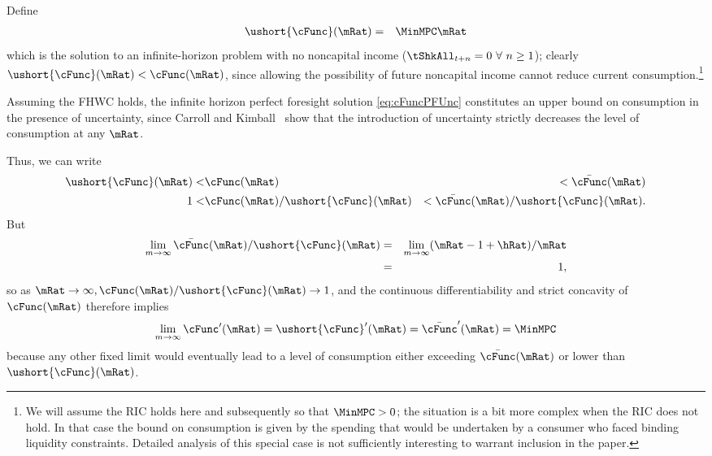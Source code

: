 \documentclass[titlepage]{\econtex}\providecommand{\texname}{BufferStockTheory}%
\begin{document}
{\label{subsec:LimitsAsmtToInfty}

Define
\begin{eqnarray}
   \ushort{\cFunc}(\mRat) & = & \MinMPC \mRat \nonumber
\end{eqnarray}
which is the solution to an infinite-horizon problem with no noncapital
income
($\tShkAll_{t+n} = 0~\forall~n\geq1$); 
  clearly $\ushort{\cFunc}(\mRat)
< \cFunc(\mRat)$, since allowing the possibility of future noncapital
income cannot reduce current consumption.\footnote{We will assume the
  RIC holds here and subsequently so that $\MinMPC > 0$; the situation
  is a bit more complex when the RIC does not hold.   In that case the bound on consumption is given by the spending
  that would be undertaken by a consumer who faced binding liquidity
  constraints.  Detailed analysis of this special case is not
  sufficiently interesting to warrant inclusion in the paper.}

Assuming the FHWC holds, the infinite horizon perfect
foresight solution \eqref{eq:cFuncPFUnc} constitutes an upper
bound on consumption in the presence of uncertainty, since Carroll and
Kimball~\citeyearpar{carroll&kimball:concavity} show that the introduction of
uncertainty strictly decreases the level of consumption at any $\mRat$.

Thus, we can write
\begin{eqnarray}  \label{eq:lowerltupper}
\ushort{\cFunc}(\mRat) < & \cFunc(\mRat) & < \bar{\cFunc}(\mRat) \nonumber \\
1 < & \cFunc(\mRat)/\ushort{\cFunc}(\mRat) & < \bar{\cFunc}(\mRat)/\ushort{\cFunc}(\mRat). \nonumber
\end{eqnarray}
But
\begin{eqnarray}  \label{eq:limitlowerupper}
\lim_{m \rightarrow \infty} \bar{\cFunc}(\mRat)/\ushort{\cFunc}(\mRat) & = &
\lim_{m \rightarrow \infty} (\mRat -1+ \hRat)/\mRat \nonumber \\
& = & 1, \nonumber
\end{eqnarray}
so as $\mRat \rightarrow \infty, \cFunc(\mRat)/\ushort{\cFunc}(\mRat)
\rightarrow 1$, and the continuous differentiability and strict
concavity of $\cFunc(\mRat)$ therefore implies
\begin{equation}  \label{eq:limxtoinftycp}
\lim_{m \rightarrow \infty} \cFunc^{\prime}(\mRat) =
\ushort{\cFunc}^{\prime}(\mRat) = \bar{\cFunc}^{\prime}(\mRat) = \MinMPC \notag
\end{equation}
because any other fixed limit would eventually lead to a level of
consumption either exceeding $\bar{\cFunc}(\mRat)$ or lower than
$\ushort{\cFunc}(\mRat)$.

}
\end{document}
